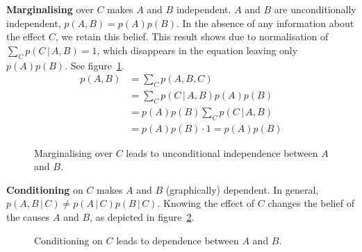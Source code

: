 \documentclass{article}
\begin{document}
\noindent \textbf{Marginalising} over $C$ makes $A$ and $B$ independent. $A$ and $B$ are unconditionally independent, $p(A, B) = p(A)p(B)$. In the absence of any information about the effect $C$, we retain this belief. This result shows due to normalisation of $\sum_C p(C \,|\, A, B) = 1$, which disappears in the equation leaving only $p(A)p(B)$. See figure~\ref{fig:margC}.
\begin{align*}
    p(A, B) &= \sum_C p(A, B, C)\\ 
    &= \sum_C p(C \,|\, A, B)p(A)p(B)\\ 
    &= p(A)p(B) \sum_C p(C \,|\, A, B)\\ 
    &= p(A)p(B) \cdot 1 = p(A)p(B)
\end{align*}
\begin{figure}[H]
    \centering
    \caption{Marginalising over $C$ leads to unconditional independence between $A$ and $B$.}
    \label{fig:margC}
\end{figure}

\noindent \textbf{Conditioning} on $C$ makes $A$ and $B$ (graphically) dependent. In general, $p(A, B \,|\, C) \neq p(A\,|\,C)p(B\,|\,C)$. Knowing the effect of $C$ changes the belief of the causes $A$ and $B$, as depicted in figure~\ref{fig:condC}.

\begin{figure}[H]
    \centering
    \caption{Conditioning on $C$ leads to dependence between $A$ and $B$.}
    \label{fig:condC}
\end{figure}
\end{document}
